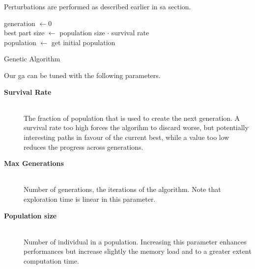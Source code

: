 \documentclass[journal]{IEEEtran}
\begin{document}
Perturbations are performed as described earlier in \gls{sa} section.

\begin{algorithm}
	generation $\gets 0$\\
	best part size $\gets$ population size $\cdot$ survival rate\\
	population $\gets$ get initial population\\
	\caption{Genetic Algorithm}\label{algo:GA}
\end{algorithm}

Our \gls{ga} can be tuned with the following parameters.
\begin{description}
	\item[\textbf{Survival Rate}] \hfill \\
	The fraction of population that is used to create the next generation. A survival rate too high forces the algorihm to discard worse, but potentially interesting paths in favour of the current best, while a value too low reduces the progress across generations.
	\item[\textbf{Max Generations}] \hfill \\
	Number of generations, the iterations of the algorithm. Note that exploration time is linear in this parameter.
	\item[\textbf{Population size}] \hfill \\
	Number of individual in a population. Increasing this parameter enhances performances but increase slightly the memory load and to a greater extent computation time.
\end{description}
\end{document}
